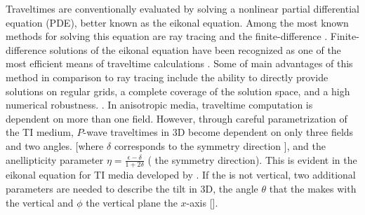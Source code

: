 Traveltimes are conventionally evaluated by solving a nonlinear partial differential equation (PDE), better known as
the eikonal equation. Among the most known methods for solving this equation are
 ray tracing and the finite-difference  . Finite-difference solutions 
of the eikonal equation have been
recognized as one of the most efficient means of traveltime
calculations
\cite[]{GEO55-05-05210526,GEO56-06-08120821,Popovici.sep.70.245,GPR49-02-01650178}.  Some of
main advantages of this method in comparison to ray tracing
 include the ability to directly provide solutions on regular grids, a
complete coverage of the solution space, and a high numerical
robustness.  \cite[]{bookC}.
In anisotropic media, traveltime computation is dependent on more than one   field. 
However, through careful parametrization of the
TI medium,
$P$-wave traveltimes in 3D become dependent on only three   fields and two angles.
 [where $\delta$ corresponds to the symmetry direction \cite[]{tsvankin:479}], and the anellipticity parameter 
 $\eta=\frac{\epsilon-\delta}{1+2 \delta}$ (  the symmetry direction).
This is evident in the eikonal equation
for TI media
developed by \cite{GEO63-02-06230631,GEO65-04-12391250}. If the    is
not vertical, two additional parameters are needed to describe the tilt in
3D, the angle $\theta$ that the    makes
with the vertical  and
$\phi$   the vertical  plane
  the $x$-axis [\cite{tsvankin:479}].

